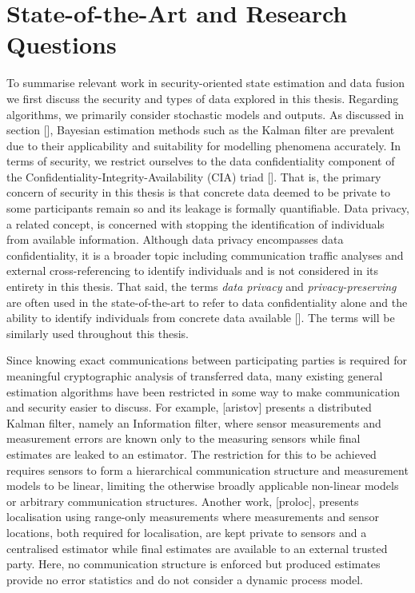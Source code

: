 \section{State-of-the-Art and Research Questions}
To summarise relevant work in security-oriented state estimation and data fusion we first discuss the security and types of data explored in this thesis. Regarding algorithms, we primarily consider stochastic models and outputs. As discussed in section [], Bayesian estimation methods such as the Kalman filter are prevalent due to their applicability and suitability for modelling phenomena accurately. In terms of security, we restrict ourselves to the data confidentiality component of the Confidentiality-Integrity-Availability (CIA) triad []. That is, the primary concern of security in this thesis is that concrete data deemed to be private to some participants remain so and its leakage is formally quantifiable. Data privacy, a related concept, is concerned with stopping the identification of individuals from available information. Although data privacy encompasses data confidentiality, it is a broader topic including communication traffic analyses and external cross-referencing to identify individuals and is not considered in its entirety in this thesis. That said, the terms \textit{data privacy} and \textit{privacy-preserving} are often used in the state-of-the-art to refer to data confidentiality alone and the ability to identify individuals from concrete data available []. The terms will be similarly used throughout this thesis. 

Since knowing exact communications between participating parties is required for meaningful cryptographic analysis of transferred data, many existing general estimation algorithms have been restricted in some way to make communication and security easier to discuss. For example, [aristov] presents a distributed Kalman filter, namely an Information filter, where sensor measurements and measurement errors are known only to the measuring sensors while final estimates are leaked to an estimator. The restriction for this to be achieved requires sensors to form a hierarchical communication structure and measurement models to be linear, limiting the otherwise broadly applicable non-linear models or arbitrary communication structures. Another work, [proloc], presents localisation using range-only measurements where measurements and sensor locations, both required for localisation, are kept private to sensors and a centralised estimator while final estimates are available to an external trusted party. Here, no communication structure is enforced but produced estimates provide no error statistics and do not consider a dynamic process model.

